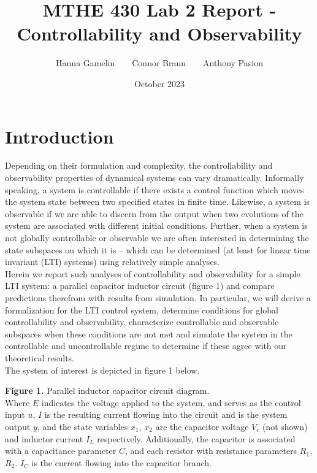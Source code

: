 \documentclass[11pt, letterpaper]{article}
\title{MTHE 430 Lab 2 Report - Controllability and Observability}
\author{Hanna Gamelin$\qquad$Connor Braun$\qquad$Anthony Pasion}
\date{October 2023}
\begin{document}
\maketitle
\section*{Introduction}
Depending on their formulation and complexity, the controllability and observability properties of dynamical systems can vary dramatically. Informally speaking, a system is controllable if there exists a control function which moves the system state between two specified states in finite time. Likewise, a system is observable if we are able to discern from the output when two evolutions of the system are associated with different initial conditions. Further, when a system is not globally controllable or observable we are often interested in determining the state subspaces on which it is -- which can be determined (at least for linear time invariant (LTI) systems) using relatively simple analyses.\\[10pt]
Herein we report such analyses of controllability and observability for a simple LTI system: a parallel
capacitor inductor circuit (figure 1) and compare predictions therefrom with results from simulation. In
particular, we will derive a formalization for the LTI control system, determine conditions for global
controllability and observability, characterize controllable and observable subspaces when these conditions are not met and simulate the system in the controllable and uncontrollable regime to determine if these
agree with our theoretical results.\\[10pt]
The system of interest is depicted in figure 1 below.\\[10pt]
\begin{center}
\end{center}
{\bf Figure 1.} Parallel inductor capacitor circuit diagram.\\[10pt]
Where $E$ indicates the voltage applied to the system, and serves as the control input $u$, $I$ is the resulting current flowing into the circuit and is the system output $y$, and the state variables $x_1$, $x_2$ are the capacitor voltage $V_c$ (not shown) and inductor current $I_L$ respectively. Additionally, the capacitor is associated with a capacitance parameter $C$, and each resistor with resistance parameters $R_1$, $R_2$. $I_C$ is the current flowing into the capacitor branch.\\[10pt]
\end{document}
